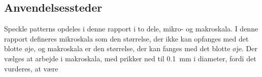 \subsection{Anvendelsessteder} \label{Anvendelsessteder}

Speckle patterns opdeles i denne rapport i to dele, mikro- og makroskala. I denne rapport defineres mikroskala som den størrelse, der ikke kan opfanges med det blotte øje, og makroskala er den størrelse, der kan fanges med det blotte øje. Der vælges at arbejde i makroskala, med prikker ned til \SI{0,1}{mm} i diameter, fordi det vurderes, at være 




